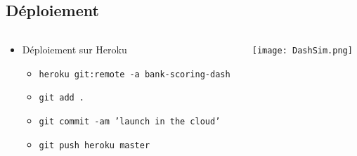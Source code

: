 \documentclass[8pt,aspectratio=169,hyperref={unicode=true}]{beamer}
\begin{document}
\subsection{Déploiement}
\begin{frame}{\insertsection}{\insertsubsection}
    \begin{columns}
        \begin{column}{.4\textwidth}
            \begin{itemize}
                \item Déploiement sur Heroku
                \begin{itemize}
                    \item \texttt{heroku git:remote -a bank-scoring-dash}
                    \item \texttt{git add .}
                    \item \texttt{git commit -am 'launch in the cloud'}
                    \item \texttt{git push heroku master}
                \end{itemize}
            \end{itemize}
        \end{column}
        \begin{column}{.6\textwidth}
            \texttt{[image: DashSim.png]}
        \end{column}
    \end{columns}
\end{frame}
\end{document}
